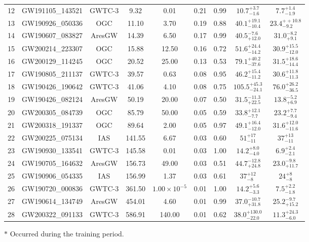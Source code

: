 \begin{table}[t]
\begin{threeparttable}
\begin{tabular}{!{\vrule width 1pt}lcccccccc!{\vrule width 1pt}}
12 & GW191105\_143521 & GWTC-3 & 9.32 & 0.01 & 0.21 & 0.99 & $10.7^{+3.7}_{-1.6}$ & $7.7^{+1.4}_{-1.9}$ \\
13 & GW190926\_050336 & OGC & 11.10 & 3.70 & 0.19 & 0.88 & $40.1^{+19.1}_{-10.4}$ & $23.4^{++10.8}_{-9.2}$ \\
14 & GW190607\_083827 & AresGW & 14.39 & 6.50 & 0.17 & 0.99 & $40.5_{+12.0}^{-7.6}$ & $31.0_{+9.1}^{-8.2}$ \\
15 & GW200214\_223307 & OGC & 15.88 & 12.50 & 0.16 & 0.72 & $51.6^{+24.4}_{-14.2}$ & $30.9^{+15.5}_{-12.0}$ \\
16 & GW200129\_114245 & OGC & 20.52 & 25.00 & 0.13 & 0.53 & $79.1^{+40.2}_{-37.6}$ & $31.5^{+18.6}_{-14.4}$ \\
17 & GW190805\_211137 & GWTC-3 & 39.57 & 0.63 & 0.08 & 0.95 & $46.2^{+15.4}_{-11.2}$ & $30.6^{+11.8}_{-11.3}$ \\
18 & GW190426\_190642 & GWTC-3 & 41.06 & 4.10 & 0.08 & 0.75 & $105.5^{+45.3}_{-24.1}$ & $76.0^{+26.2}_{-36.5}$ \\
19 & GW190426\_082124 & AresGW & 50.19 & 20.00 & 0.07 & 0.50 & $31.5_{+22.5}^{-11.3}$ & $13.8_{+6.9}^{-5.2}$ \\
20 & GW200305\_084739 & OGC & 85.79 & 50.00 & 0.05 & 0.59 & $33.8^{+12.1}_{-7.7}$ & $23.2^{+7.7}_{-9.4}$ \\
21 & GW200318\_191337 & OGC & 89.64 & 2.00 & 0.05 & 0.97 & $49.1^{+16.4}_{-12.0}$ & $31.6^{+12.0}_{-11.6}$ \\
22 & GW200225\_075134 & IAS & 141.55 & 6.67 & 0.03 & 0.60 & $51_{-11}^{+17}$ & $37_{-11}^{+13}$ \\
23 & GW190930\_133541 & GWTC-3 & 145.58 & 0.01 & 0.03 & 1.00 & $14.2^{+8.0}_{-4.0}$ & $6.9^{+2.4}_{-2.1}$ \\
24 & GW190705\_164632 & AresGW & 156.73 & 49.00 & 0.03 & 0.51 & $44.7_{+24.8}^{-12.8}$ & $23.0_{+11.7}^{-9.8}$ \\
25 & GW190906\_054335 & IAS & 156.99 & 1.37 & 0.03 & 0.61 & $37_{-8}^{+12}$ & $24_{-8}^{+8}$ \\
26 & GW190720\_000836 & GWTC-3 & 361.50 & $1.00 \times 10^{-5}$ & 0.01 & 1.00 & $14.2^{+5.6}_{-3.3}$ & $7.5^{+2.2}_{-1.8}$ \\
27 & GW190614\_134749 & AresGW & 454.01 & 4.60 & 0.01 & 0.99 & $37.0_{+31.8}^{-10.7}$ & $25.2_{+15.2}^{-9.7}$ \\
28 & GW200322\_091133 & GWTC-3 & 586.91 & 140.00 & 0.01 & 0.62 & $38.0^{+130.0}_{-22.0}$ & $11.3^{+24.3}_{-6.0}$ \\
\bottomrule[1pt]
\end{tabular}
\begin{tablenotes}
\small
\item[$*$] Occurred during the training period.
\end{tablenotes}
\end{threeparttable}
\end{table}